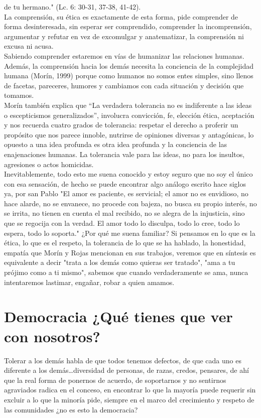 \documentclass[12pt]{book} %
\begin{document}
de tu hermano." (Lc. 6: 30-31, 37-38, 41-42).\\

La comprensión, su ética es exactamente de esta forma, pide comprender de forma desinteresada, sin esperar ser comprendido, comprender la incomprensión, argumentar y refutar en vez de excomulgar y anatematizar, la comprensión ni excusa ni acusa.\\
 Sabiendo comprender estaremos en vías de humanizar las relaciones humanas. Además, la comprensión hacia los demás necesita la conciencia de la complejidad humana (Morín, 1999) porque como humanos no somos entes simples, sino llenos de facetas, pareceres, humores y cambiamos con cada situación y decisión que tomamos.\\
 
Morín también explica que “La verdadera tolerancia no es indiferente a las ideas o escepticismos generalizados”, involucra convicción, fe, elección ética, aceptación y nos recuerda cuatro grados de tolerancia: respetar el derecho a proferir un propósito que nos parece innoble, nutrirse de opiniones diversas y antagónicas, lo opuesto a una idea profunda es otra idea profunda y la conciencia de las enajenaciones humanas. La tolerancia vale para las ideas, no para los insultos, agresiones o actos homicidas.\\

Inevitablemente, todo esto me suena conocido y estoy seguro que no soy el único con esa sensación, de hecho se puede encontrar algo análogo escrito hace siglos ya, por san Pablo "El amor es paciente, es servicial; el amor no es envidioso, no hace alarde, no se envanece, no procede con bajeza, no busca su propio interés, no se irrita, no tienen en cuenta el mal recibido, no se alegra de la injusticia, sino que se regocija con la verdad. El amor todo lo disculpa, todo lo cree, todo lo espera, todo lo soporta." ¿Por qué me suena familiar? Si pensamos en lo que es la ética, lo que es el respeto, la tolerancia de lo que se ha hablado, la honestidad, empatía que Morín y Rojas mencionan en sus trabajos, veremos que en síntesis es equivalente a decir "trata a los demás como quieras ser tratado", "ama a tu prójimo como a ti mismo", sabemos que cuando verdaderamente se ama, nunca intentaremos lastimar, engañar, robar a quien amamos.

\section{Democracia ¿Qué tienes que ver con nosotros?}
Tolerar a los demás habla de que todos tenemos defectos, de que cada uno es diferente a los demás\ldots diversidad de personas, de razas, credos, pensares, de ahí que la real forma de ponernos de acuerdo, de soportarnos y no sentirnos agraviados radica en el conceso, en encontrar lo que la mayoría puede requerir sin excluir a lo que la minoría pide, siempre en el marco del crecimiento y respeto de las comunidades ¿no es esto la democracia?\\
\end{document}
